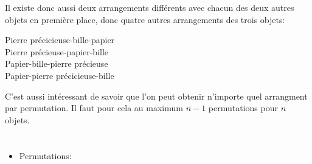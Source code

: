 {{Il existe donc aussi deux arrangements différents avec chacun des deux autres objets en première place, donc quatre autres arrangements des trois objets:

\begin{adjustwidth}{1.5em}{0em}
Pierre précicieuse-bille-papier  \\
Pierre précieuse-papier-bille    \\
Papier-bille-pierre précieuse    \\
Papier-pierre précicieuse-bille
\end{adjustwidth}

C’est aussi intéressant de savoir que l’on peut obtenir n’importe quel arrangment par permutation. Il faut pour cela au maximum ${n-1}$ permutations pour ${n}$ objets.



\section*{\BrochureWebsitesAndKeywords}
{\raggedright
\begin{itemize}
  \item Permutations: \href{https://fr.wikipedia.org/wiki/Permutation}{}
\end{itemize}


}

}{}

\def\AuthorSpielerB{} %
\def\AuthorBernerT{} %
\def\AuthorMilojkovicJ{} %
\def\AuthorGonzalesM{} %
\def\AuthorChanS{} %
\def\AuthorFutschekG{} %
\def\AuthorWeigendM{} %
\def\AuthorDatzkoS{} %
\def\AuthorPelletE{} %

\newpage}{}
